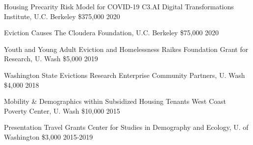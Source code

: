 



\begin{cvhonors}

  \cvhonor
    {Housing Precarity Risk Model for COVID-19} %
    {C3.AI Digital Transformations Institute, U.C. Berkeley} %
    {\$375,000} %
    {2020} %

  \cvhonor
    {Eviction Causes} %
    {The Cloudera Foundation, U.C. Berkeley} %
    {\$75,000} %
    {2020} %

  \cvhonor
    {Youth and Young Adult Eviction and Homelessness} %
    {Raikes Foundation Grant for Research, U. Wash} %
    {\$5,000} %
    {2019} %

  \cvhonor
    {Washington State Evictions Research} %
    {Enterprise Community Partners, U. Wash} %
    {\$4,000} %
    {2018} %

   \cvhonor
    {Mobility \& Demographics within Subsidized Housing Tenants} %
    {West Coast Poverty Center, U. Wash} %
    {\$10,000} %
    {2015} %
    
  \cvhonor
    {Presentation Travel Grants} %
    {Center for Studies in Demography and Ecology, U. of Washington} %
    {\$3,000} %
    {2015-2019} %


\end{cvhonors}


